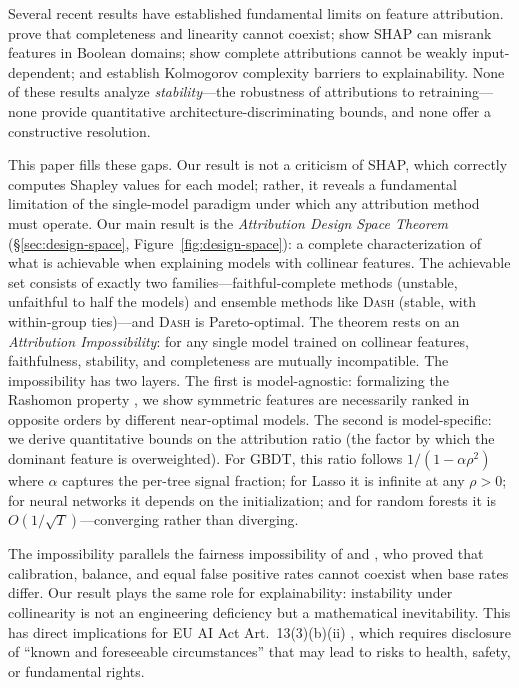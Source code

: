 \documentclass{article}
\newcommand{\DASH}{\textsc{Dash}}
\newcommand{\GBDT}{\textsc{GBDT}}
\begin{document}
\begin{sloppypar}
Several recent results have established fundamental limits on feature attribution.
\citet{bilodeau2024impossibility} prove that completeness and linearity cannot coexist;
\citet{huang2024failings} show SHAP can misrank features in Boolean domains;
\citet{srinivas2019full} show complete attributions cannot be weakly input-dependent;
and \citet{rao2025limits} establish Kolmogorov complexity barriers to explainability.
None of these results analyze \emph{stability}---the robustness of attributions to
retraining---none provide quantitative architecture-discriminating bounds, and none
offer a constructive resolution.
\end{sloppypar}

\begin{sloppypar}
This paper fills these gaps. Our result is not a criticism of SHAP, which correctly computes Shapley values for each model; rather, it reveals a fundamental limitation of the single-model paradigm under which any attribution method must operate.
Our main result is the \emph{Attribution Design Space Theorem}
(\S\ref{sec:design-space}, Figure~\ref{fig:design-space}): a complete
characterization of what is achievable when explaining models with collinear features.
The achievable set consists of exactly two families---faithful-complete methods
(unstable, unfaithful to half the models) and ensemble methods like \DASH{} (stable,
with within-group ties)---and \DASH{} is Pareto-optimal.
The theorem rests on an \emph{Attribution Impossibility}: for any single model trained
on collinear features, faithfulness, stability, and completeness are mutually
incompatible.
The impossibility has two layers.
The first is model-agnostic: formalizing the Rashomon property
\citep{rudin2024amazing}, we show symmetric features are necessarily ranked in
opposite orders by different near-optimal models.
The second is model-specific: we derive quantitative bounds on the attribution ratio
(the factor by which the dominant feature is overweighted).
For \GBDT{}, this ratio follows $1/(1-\alpha\rho^2)$ where $\alpha$ captures the
per-tree signal fraction; for Lasso it is infinite at any $\rho > 0$; for neural
networks it depends on the initialization; and for random forests it is
$O(1/\sqrt{T})$---converging rather than diverging.
\end{sloppypar}

\begin{sloppypar}
The impossibility parallels the fairness impossibility of \citep{chouldechova2017fair} and \citep{kleinberg2017inherent}, who proved that calibration, balance, and equal false positive rates cannot coexist when base rates differ. Our result plays the same role for explainability: instability under collinearity is not an engineering deficiency but a mathematical inevitability. This has direct implications for EU AI Act Art.~13(3)(b)(ii) \citep{euaiact2024}, which requires disclosure of ``known and foreseeable circumstances'' that may lead to risks to health, safety, or fundamental rights.
\end{sloppypar}
\end{document}
